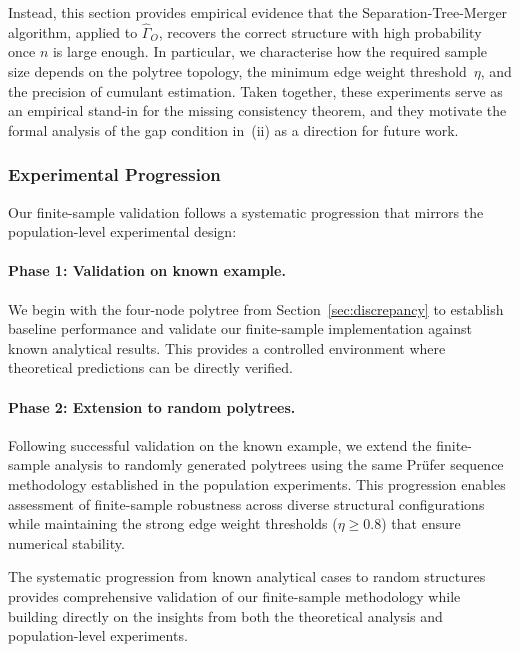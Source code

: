 \documentclass[11pt,a4paper]{article}
\numberwithin{equation}{section}
\begin{document}
Instead, this section provides empirical evidence that the Separation-Tree-Merger
algorithm, applied to $\hat\Gamma_O$, recovers the correct structure with high
probability once $n$ is large enough.  In particular, we characterise how the
required sample size depends on the polytree topology, the minimum edge weight
threshold~$\eta$, and the precision of cumulant estimation.  Taken together,
these experiments serve as an empirical stand-in for the missing consistency
theorem, and they motivate the formal analysis of the gap condition in~(ii) as
a direction for future work.

\subsubsection{Experimental Progression}

Our finite-sample validation follows a systematic progression that mirrors the population-level experimental design:

\paragraph{Phase 1: Validation on known example.} We begin with the four-node polytree from Section~\ref{sec:discrepancy} to establish baseline performance and validate our finite-sample implementation against known analytical results. This provides a controlled environment where theoretical predictions can be directly verified.

\paragraph{Phase 2: Extension to random polytrees.} Following successful validation on the known example, we extend the finite-sample analysis to randomly generated polytrees using the same Prüfer sequence methodology established in the population experiments. This progression enables assessment of finite-sample robustness across diverse structural configurations while maintaining the strong edge weight thresholds ($\eta \geq 0.8$) that ensure numerical stability.

The systematic progression from known analytical cases to random structures provides comprehensive validation of our finite-sample methodology while building directly on the insights from both the theoretical analysis and population-level experiments.
\end{document}
